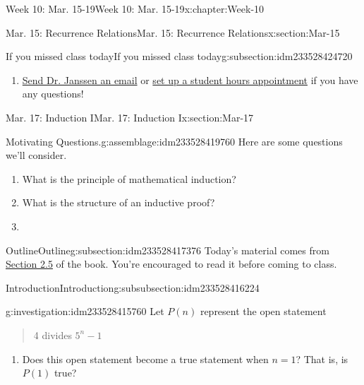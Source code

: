 \documentclass[oneside,10pt,]{book}
\numberwithin{equation}{section}
\begin{document}
\begin{chapterptx}{Week 10: Mar. 15-19}{}{Week 10: Mar. 15-19}{}{}{x:chapter:Week-10}
\begin{sectionptx}{Mar. 15: Recurrence Relations}{}{Mar. 15: Recurrence Relations}{}{}{x:section:Mar-15}
\begin{subsectionptx}{If you missed class today}{}{If you missed class today}{}{}{g:subsection:idm233528424720}
\begin{enumerate}
\item{}\href{mailto:mike.janssen@dordt.edu}{Send Dr. Janssen an email} or \href{https://calendly.com/mkjanssen/student-hours}{set up a student hours appointment} if you have any questions!%
\end{enumerate}
\end{subsectionptx}
\end{sectionptx}
%
%
\typeout{************************************************}
\typeout{************************************************}
%
\begin{sectionptx}{Mar. 17: Induction I}{}{Mar. 17: Induction I}{}{}{x:section:Mar-17}
\begin{introduction}{}%
\begin{assemblage}{Motivating Questions.}{g:assemblage:idm233528419760}%
Here are some questions we'll consider. %
\begin{enumerate}
\item{}What is the principle of mathematical induction?%
\item{}What is the structure of an inductive proof?%
\item{}%
\end{enumerate}
%
\end{assemblage}
\end{introduction}%
%
%
\typeout{************************************************}
\typeout{************************************************}
%
\begin{subsectionptx}{Outline}{}{Outline}{}{}{g:subsection:idm233528417376}
Today's material comes from \href{http://discrete.openmathbooks.org/dmoi3/sec_seq-induction.html}{Section 2.5} of the book. You're encouraged to read it before coming to class.%
%
%
\typeout{************************************************}
\typeout{************************************************}
%
\begin{subsubsectionptx}{Introduction}{}{Introduction}{}{}{g:subsubsection:idm233528416224}
\begin{investigation}{}{g:investigation:idm233528415760}%
Let \(P(n)\) represent the open statement%
\begin{quote}%
4 divides \(5^n - 1\)\end{quote}
%
\begin{enumerate}
\item{}Does this open statement become a true statement when \(n=1\)? That is, is \(P(1)\) true?%

\end{enumerate}
\end{investigation}
\end{subsubsectionptx}
\end{subsectionptx}
\end{sectionptx}
\end{chapterptx}
\end{document}
